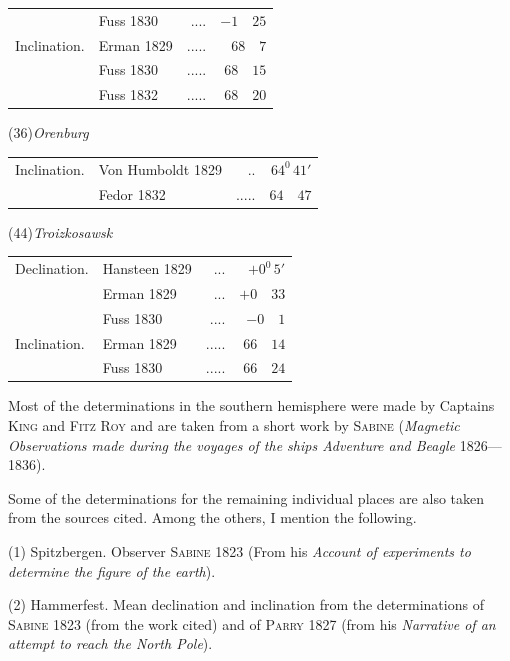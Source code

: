 \begin{center}
\begin{minipage}[t]{\linewidth}
\begin{tabular}{llrr}
&Fuss 1830&.\quad.\quad.\quad.&$-1\quad25$\\
Inclination.&Erman 1829&.\quad.\quad.\quad.\quad.&$68\quad7$\\
&Fuss 1830&.\quad.\quad.\quad.\quad.&$68\quad15$\\
&Fuss 1832&.\quad.\quad.\quad.\quad.&$68\quad20$
\end{tabular}
\end{minipage}\par\medskip
\begin{minipage}[t]{\linewidth}\centering
(36)\quad\textit{Orenburg}\par\smallskip
\begin{tabular}{llrr}
Inclination.&Von Humboldt 1829&.\quad.&$64^0\,41'$\\
&Fedor 1832&.\quad.\quad.\quad.\quad.&$64\quad47$
\end{tabular}
\end{minipage}\par\medskip
\begin{minipage}[t]{\linewidth}\centering
(44)\quad\textit{Troizkosawsk}\par\smallskip
\begin{tabular}{llrr}
Declination.&Hansteen 1829&.\quad.\quad.&$+0^0\,5'$\\
&Erman 1829&.\quad.\quad.&$+0\quad33$\\
&Fuss 1830&.\quad.\quad.\quad.&$-0\quad1$\\
Inclination.&Erman 1829&.\quad.\quad.\quad.\quad.&$66\quad14$\\
&Fuss 1830&.\quad.\quad.\quad.\quad.&$66\quad24$
\end{tabular}
\end{minipage}
\end{center}

Most of the determinations in the southern hemisphere were made by Captains \textsc{King} and \textsc{Fitz Roy} and are taken from a short work by \textsc{Sabine} (\textit{Magnetic Observations made during the voyages of the ships Adventure and Beagle} 1826—1836).

Some of the determinations for the remaining individual places are also taken from the sources cited. Among the others, I mention the following.

(1) Spitzbergen. Observer \textsc{Sabine} 1823 (From his \textit{Account of experiments to determine the figure of the earth}).

(2) Hammerfest. Mean declination and inclination from the determinations of \textsc{Sabine} 1823 (from the work cited) and of \textsc{Parry} 1827 (from his \textit{Narrative of an attempt to reach the North Pole}).

